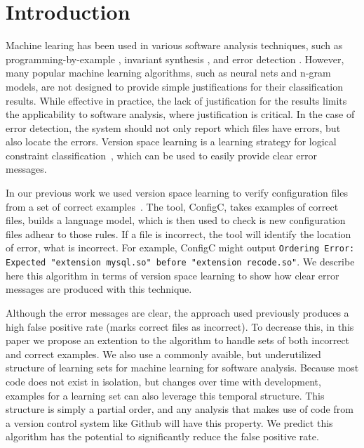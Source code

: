 \section{Introduction}

Machine learing has been used in various software analysis techniques, such as programming-by-example \cite{lau2000version}, invariant synthesis \cite{garg2014ice}, and error detection \cite{Santolucito2016}.
However, many popular machine learning algorithms, such as neural nets and n-gram models, are not designed to provide simple justifications for their classification results.
While effective in practice, the lack of justification for the results limits the applicability to software analysis, where justification is critical.
In the case of error detection, the system should not only report which files have errors, but also locate the errors.
Version space learning is a learning strategy for logical constraint classification~\cite{mitchell82}, which can be used to easily provide clear error messages.


In our previous work we used version space learning to verify configuration files from a set of correct examples~\cite{Santolucito2016}.
The tool, ConfigC, takes examples of correct files, builds a language model, which is then used to check is new configuration files adhear to those rules.
If a file is incorrect, the tool will identify the location of error, what is incorrect.
For example, ConfigC might output \texttt{Ordering Error: Expected "extension mysql.so" before "extension recode.so"}.
We describe here this algorithm in terms of version space learning to show how clear error messages are produced with this technique.

Although the error messages are clear, the approach used previously produces a high false positive rate (marks correct files as incorrect).
To decrease this, in this paper we propose an extention to the algorithm to handle sets of both incorrect and correct examples.
We also use a commonly avaible, but underutilized structure of learning sets for machine learning for software analysis.
Because most code does not exist in isolation, but changes over time with development, examples for a learning set can also leverage this temporal structure. 
This structure is simply a partial order, and any analysis that makes use of code from a version control system like Github will have this property.
We predict this algorithm has the potential to significantly reduce the false positive rate.

